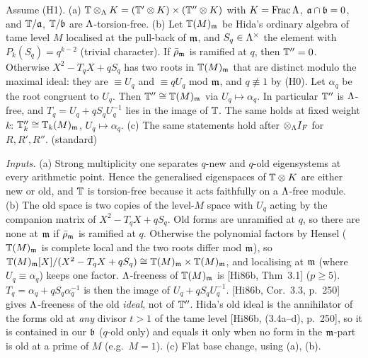 \begin{lemma}\label{lem:s06-decomp}
Assume (H1). (a) $\mathbb{T}\otimes_\Lambda K=(\mathbb{T}'\otimes K)\times(\mathbb{T}''\otimes K)$ with $K=\mathrm{Frac}\,\Lambda$, $\mathfrak{a}\cap\mathfrak{b}=0$, and
$\mathbb{T}/\mathfrak{a}$, $\mathbb{T}/\mathfrak{b}$ are $\Lambda$-torsion-free. (b) Let $\mathbb{T}(M)_{\mathfrak{m}}$ be Hida's ordinary algebra of tame level $M$ localised at the
pull-back of $\mathfrak{m}$, and $S_q\in\Lambda^\times$ the element with $P_k(S_q)=q^{k-2}$ (trivial character). If $\bar\rho_{\mathfrak{m}}$ is ramified at
$q$, then $\mathbb{T}''=0$. Otherwise $X^2-T_qX+qS_q$ has two roots in $\mathbb{T}(M)_{\mathfrak{m}}$ that are distinct modulo the maximal ideal: they are
$\equiv U_q$ and $\equiv qU_q$ mod $\mathfrak{m}$, and $q\not\equiv1$ by (H0). Let $\alpha_q$ be the root congruent to $U_q$. Then
$\mathbb{T}''\cong\mathbb{T}(M)_{\mathfrak{m}}$ via $U_q\mapsto\alpha_q$. In particular $\mathbb{T}''$ is $\Lambda$-free, and $T_q=U_q+qS_qU_q^{-1}$ lies in the image
of $\mathbb{T}$. The same holds at fixed weight $k$: $\mathbb{T}''_k\cong\mathbb{T}_k(M)_{\mathfrak{m}}$, $U_q\mapsto\alpha_q$.
 (c) The same statements hold after
$\otimes_\Lambda I_F$ for $R,R',R''$. \sttoprove{} (standard)
\end{lemma}
\noindent\emph{Inputs.} (a) Strong multiplicity one separates $q$-new and $q$-old eigensystems at every arithmetic point. Hence the
generalised eigenspaces of $\mathbb{T}\otimes K$ are either new or old, and $\mathbb{T}$ is torsion-free because it acts faithfully on a $\Lambda$-free
module. (b) The old space is two copies of the level-$M$ space with $U_q$ acting by the companion matrix of $X^2-T_qX+qS_q$. Old forms
are unramified at $q$, so there are none at $\mathfrak{m}$ if $\bar\rho_{\mathfrak{m}}$ is ramified at $q$. Otherwise the polynomial factors by Hensel
($\mathbb{T}(M)_{\mathfrak{m}}$ is complete local and the two roots differ mod $\mathfrak{m}$), so $\mathbb{T}(M)_{\mathfrak{m}}[X]/(X^2-T_qX+qS_q)\cong\mathbb{T}(M)_{\mathfrak{m}}\times\mathbb{T}(M)_{\mathfrak{m}}$, and
localising at $\mathfrak{m}$ (where $U_q\equiv\alpha_q$) keeps one factor. $\Lambda$-freeness of $\mathbb{T}(M)_{\mathfrak{m}}$ is [Hi86b, Thm~3.1]
 ($p\ge5$). $T_q=\alpha_q+qS_q\alpha_q^{-1}$ is
then the image of $U_q+qS_qU_q^{-1}$.  [Hi86b, Cor.~3.3, p.~250] gives $\Lambda$-freeness of the old \emph{ideal}, not of $\mathbb{T}''$. Hida's old
ideal is the annihilator of the forms old at \emph{any} divisor $t>1$ of the tame level [Hi86b, (3.4a--d), p.~250], so it is contained in
our $\mathfrak{b}$ ($q$-old only) and equals it only when no form in the $\mathfrak{m}$-part is old at a prime of $M$ (e.g.\ $M=1$).
(c) Flat base change, using (a), (b).

